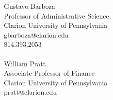\documentclass[9pt]{article}
\begin{document}
Gustavo Barboza \\
Professor of Administrative Science \\
Clarion University of Pennsylvania \\
gbarboza@clarion.edu \\
814.393.2053 \\
\\
William Pratt \\
Associate Professor of Finance \\
Clarion University of Pennsylvania \\
pratt@clarion.edu


\end{document}
